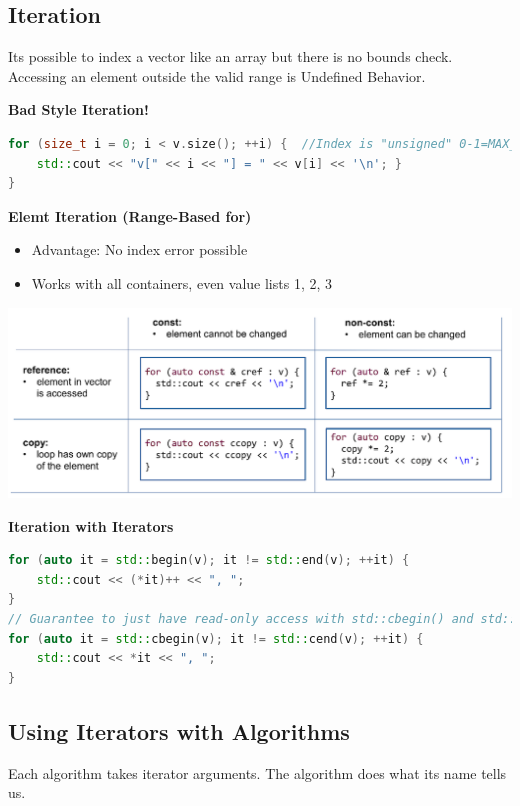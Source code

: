 \subsection{Iteration}
Its possible to index a vector like an array but there is no bounds check.    Accessing an element outside the valid range is Undefined Behavior.

\textbf{Bad Style Iteration!}\\
\begin{lstlisting}[language=C++]
for (size_t i = 0; i < v.size(); ++i) {  //Index is "unsigned" 0-1=MAX_INT
	std::cout << "v[" << i << "] = " << v[i] << '\n'; }
}	
\end{lstlisting}

\textbf{Elemt Iteration (Range-Based for)}
\begin{itemize}
  \itemsep -0.5em 
  \item Advantage: No index error possible 
  \item Works with all containers, even value lists {1, 2, 3}
\end{itemize}

\begin{center}
\includegraphics[width=0.75\linewidth]{images/elementiteration}	
\end{center}

\textbf{Iteration with Iterators}
\begin{lstlisting}[language=C++]
for (auto it = std::begin(v); it != std::end(v); ++it) {
	std::cout << (*it)++ << ", "; 
}
// Guarantee to just have read-only access with std::cbegin() and std::cend()
for (auto it = std::cbegin(v); it != std::cend(v); ++it) {
	std::cout << *it << ", "; 
}
\end{lstlisting}

\subsection{Using Iterators with Algorithms}
 Each algorithm takes iterator arguments. The algorithm does what its name tells us. 
 
